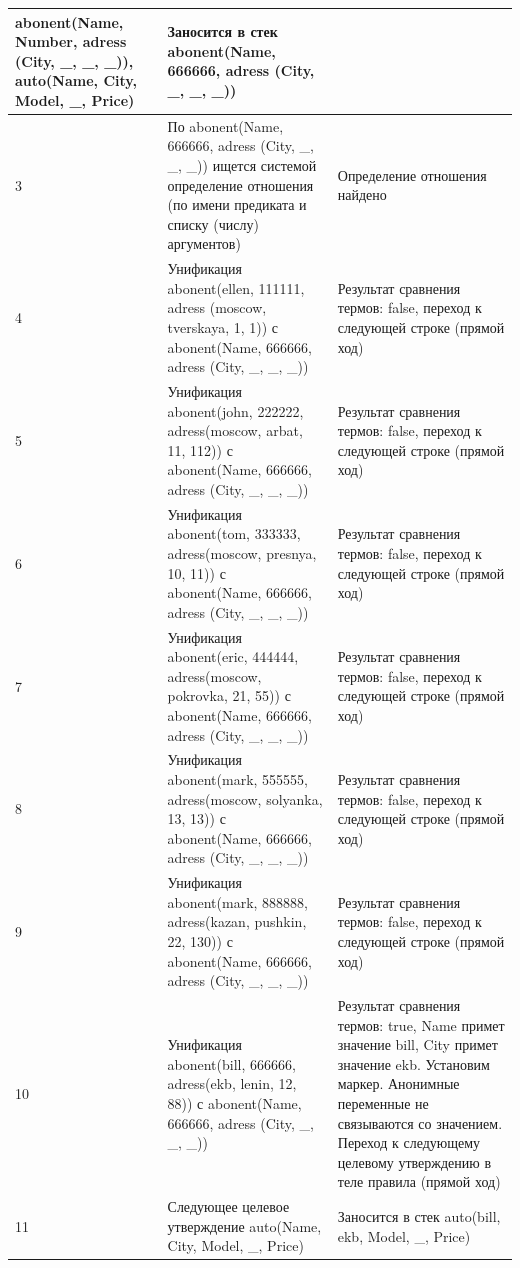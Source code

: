 \documentclass[a4paper,14pt]{extreport} %
\begin{document}
\begin{enumerate}
\begin{enumerate}
\begin{longtable}{|p{1.1cm}|p{8.5cm}|p{7cm}|}
	abonent(Name, Number, adress (City, \_, \_, \_)), auto(Name, City, Model, \_, Price) 
	
	& Заносится в стек abonent(Name, 666666, adress (City, \_, \_, \_)) \\ \hline
	
	3 & По abonent(Name, 666666, adress (City, \_, \_, \_)) ищется системой определение отношения (по имени предиката и списку (числу) аргументов) & Определение отношения найдено \\ \hline
	
	4 & Унификация abonent(ellen, 111111, adress (moscow, tverskaya, 1, 1)) с abonent(Name, 666666, adress (City, \_, \_, \_)) & Результат сравнения термов: false, переход к следующей строке (прямой ход) \\ \hline
	5 & Унификация abonent(john, 222222, adress(moscow, arbat, 11, 112)) с abonent(Name, 666666, adress (City, \_, \_, \_)) & Результат сравнения термов: false, переход к следующей строке (прямой ход) \\ \hline
	6 & Унификация abonent(tom, 333333, adress(moscow, presnya, 10, 11)) с abonent(Name, 666666, adress (City, \_, \_, \_)) & Результат сравнения термов: false, переход к следующей строке (прямой ход) \\ \hline
	7 & Унификация abonent(eric, 444444, adress(moscow, pokrovka, 21, 55)) с abonent(Name, 666666, adress (City, \_, \_, \_)) & Результат сравнения термов: false, переход к следующей строке (прямой ход) \\ \hline
	8 & Унификация abonent(mark, 555555, adress(moscow, solyanka, 13, 13)) с abonent(Name, 666666, adress (City, \_, \_, \_)) & Результат сравнения термов: false, переход к следующей строке (прямой ход) \\ \hline
	9 & Унификация abonent(mark, 888888, adress(kazan, pushkin, 22, 130)) с abonent(Name, 666666, adress (City, \_, \_, \_)) & Результат сравнения термов: false, переход к следующей строке (прямой ход) \\ \hline
	10 & Унификация abonent(bill, 666666, adress(ekb, lenin, 12, 88)) с abonent(Name, 666666, adress (City, \_, \_, \_)) & Результат сравнения термов: true, Name примет значение bill, City примет значение ekb. Установим маркер.  Анонимные переменные не связываются со значением. Переход к следующему целевому утверждению в теле правила (прямой ход) \\ \hline
	11 & Следующее целевое утверждение auto(Name, City, Model, \_, Price) & Заносится в стек auto(bill, ekb, Model, \_, Price)  \\ \hline

\end{longtable}
\end{enumerate}
\end{enumerate}
\end{document}
